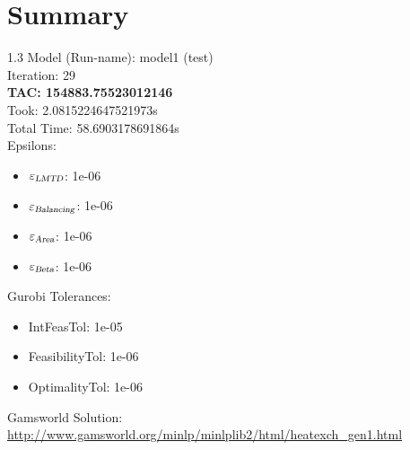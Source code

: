 \documentclass{article}%
\begin{document}
%
\normalsize%
\section{Summary}%
\thispagestyle{plain}%
\begin{spacing}{1.3}%
\Large%
Model (Run-name): model1 (test)\\%
Iteration: 29\\%
\textbf{TAC: 154883.75523012146}\\%
Took: 2.0815224647521973s\\%
Total Time: 58.6903178691864s\\%
Epsilons:%
\begin{itemize}%
	\item $\varepsilon_{\textsl{LMTD}}$: 1e-06%
	\item $\varepsilon_{\textsl{Balancing}}$: 1e-06%
	\item $\varepsilon_{\textsl{Area}}$: 1e-06%
	\item $\varepsilon_{\textsl{Beta}}$: 1e-06%
\end{itemize}%
Gurobi Tolerances:%
\begin{itemize}%
	\item IntFeasTol: 1e-05%
	\item FeasibilityTol: 1e-06%
	\item OptimalityTol: 1e-06%
\end{itemize}%
\end{spacing}%
\normalsize%
Gamsworld Solution: \url{http://www.gamsworld.org/minlp/minlplib2/html/heatexch_gen1.html}%
%
\clearpage%
\end{document}
